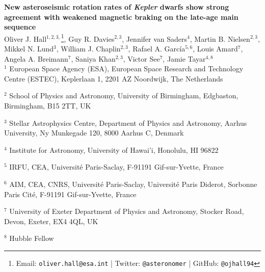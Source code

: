 \documentclass[12pt]{article}
\renewcommand*{\thefootnote}{\fnsymbol{footnote}}
\begin{document}
\noindent\textbf{\LARGE{New asteroseismic rotation rates of \emph{Kepler} dwarfs show strong agreement with weakened magnetic braking on the late-age main sequence}}\\

\noindent Oliver J. Hall$^{1,2,3,}$\footnote[1]{Email: \texttt{oliver.hall@esa.int} | Twitter: \texttt{@asteronomer} | GitHub: \texttt{@ojhall94}},
	Guy R. Davies$^{2,3}$, 
	Jennifer van Saders$^{4}$,
	Martin B. Nielsen$^{2,3}$,
	Mikkel N. Lund$^{3}$, 
	William J. Chaplin$^{2,3}$, 
	Rafael A. Garc\'ia$^{5, 6}$, 
	Louis Amard$^{7}$,
	Angela A. Breimann$^{7}$, 
	Saniya Khan$^{2,3}$, 
	Victor See$^{7}$, 
	Jamie Tayar$^{4, 8}$
	\\
	
	\noindent $^{1}$ European Space Agency (ESA), European Space Research and Technology Centre (ESTEC), Keplerlaan 1, 2201 AZ Noordwijk, The Netherlands

	\noindent 	$^{2}$ School of Physics and Astronomy, University of Birmingham, Edgbaston, Birmingham, B15 2TT, UK

	\noindent 	$^{3}$ Stellar Astrophysics Centre, Department of Physics and Astronomy, Aarhus University, Ny Munkegade 120, 8000 Aarhus C, Denmark

	\noindent 	$^{4}$ Institute for Astronomy, University of Hawai'i, Honolulu, HI 96822

	\noindent 	$^{5}$ IRFU, CEA, Universit\'e Paris-Saclay, F-91191 Gif-sur-Yvette, France

	\noindent 	$^{6}$ AIM, CEA, CNRS, Universit\'e Paris-Saclay, Universit\'e Paris Diderot, Sorbonne Paris Cit\'e, F-91191 Gif-sur-Yvette, France

	\noindent 	$^{7}$ University of Exeter Department of Physics and Astronomy, Stocker Road, Devon, Exeter, EX4 4QL, UK
	
	\noindent $^{8}$ Hubble Fellow


\vspace{10mm}

\renewcommand*{\thefootnote}{\arabic{footnote}}
\setcounter{footnote}{0}
\end{document}
